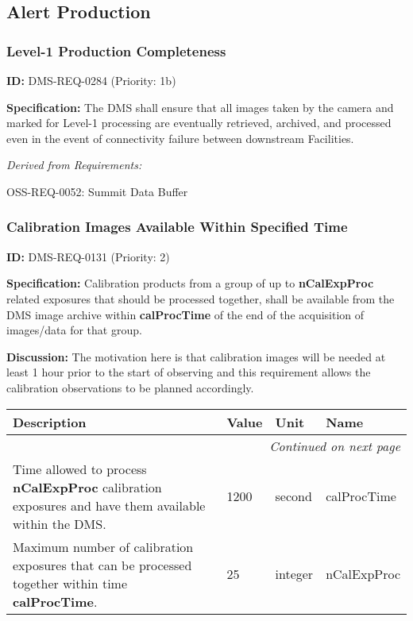 \documentclass[SE,toc,lsstdraft]{lsstdoc}
\makeatletter
\newcommand{\paramname}[1]{\hspace{0pt}#1}
\newcommand{\unitname}[1]{\hspace{0pt}#1}
\newenvironment{parameters}[0]{%
\setlength\LTleft{0pt}
\setlength\LTright{\fill}
\begin{small}
\begin{longtable}[]{|p{0.49\textwidth}|l|p{0.6in}|p{1.70in}@{}|}

\hline \textbf{Description} & \textbf{Value} & \textbf{Unit} & \textbf{Name} \\ \hline
\endhead

\hline \multicolumn{4}{r}{\emph{Continued on next page}} \\
\endfoot

\hline\hline
\endlastfoot
}{%
\hline
\end{longtable}
\end{small}
}
\makeatother
\begin{document}
\subsection{Alert Production}

\subsubsection{Level-1 Production Completeness}

\label{DMS-REQ-0284}
\textbf{ID:} DMS-REQ-0284 (Priority: 1b)

\textbf{Specification:} The DMS shall ensure that all images taken by the camera and marked for Level-1 processing are eventually retrieved, archived, and processed even in the event of connectivity failure between downstream Facilities.

\emph{Derived from Requirements:}

OSS-REQ-0052:
Summit Data Buffer \newline

\subsubsection{Calibration Images Available Within Specified Time}

\label{DMS-REQ-0131}
\textbf{ID:} DMS-REQ-0131 (Priority: 2)

\textbf{Specification:} Calibration products from a group of up to \textbf{nCalExpProc} related exposures that should be processed together, shall be available from the DMS image archive within \textbf{calProcTime} of the end of the acquisition of images/data for that group.

\textbf{Discussion: }The motivation here is that calibration images will be needed at least 1 hour prior to the start of observing and this requirement allows the calibration observations to be planned accordingly.

\begin{parameters}
Time allowed to process \textbf{nCalExpProc} calibration exposures and have them available within the DMS.
&
1200
&
\unitname{%
second
}
&
\paramname{%
calProcTime
} \\\hline

Maximum number of calibration exposures that can be processed together within time \textbf{calProcTime}.

&
25
&
\unitname{%
integer
}
&
\paramname{%
nCalExpProc
} \\\hline
\end{parameters}
\end{document}
